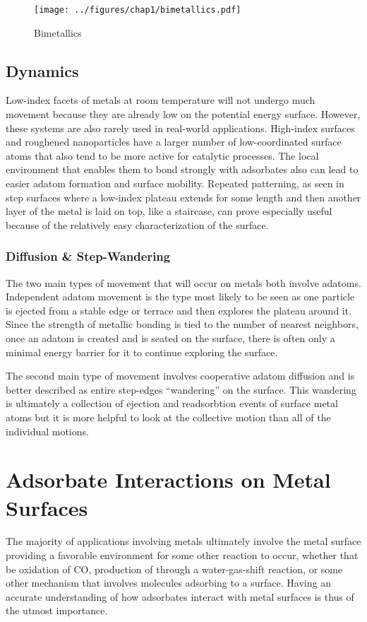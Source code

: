 \begin{figure}
  \texttt{[image: ../figures/chap1/bimetallics.pdf]}
  \caption{Bimetallics}
\label{fig:bimetallics}
\end{figure}

\subsection{Dynamics}
Low-index facets of metals at room temperature will not undergo much movement
because they are already low on the potential energy surface. However, these
systems are also rarely used in real-world applications. High-index surfaces
and roughened nanoparticles have a larger number of low-coordinated surface
atoms that also tend to be more active for catalytic processes. The local
environment that enables them to bond strongly with adsorbates also can lead to
easier adatom formation and surface mobility. Repeated patterning, as seen in
step surfaces where a low-index plateau extends for some length and then
another layer of the metal is laid on top, like a staircase, can prove
especially useful because of the relatively easy characterization of the
surface.

\subsubsection{Diffusion \& Step-Wandering}
The two main types of movement that will occur on metals both involve adatoms.
Independent adatom movement is the type most likely to be seen as one particle
is ejected from a stable edge or terrace and then explores the plateau around
it. Since the strength of metallic bonding is tied to the number of nearest
neighbors, once an adatom is created and is seated on the surface, there is
often only a minimal energy barrier for it to continue exploring the surface. 

The second main type of movement involves cooperative adatom diffusion and is
better described as entire step-edges ``wandering'' on the surface. This
wandering is ultimately a collection of ejection and readsorbtion events of
surface metal atoms but it is more helpful to look at the collective motion
than all of the individual motions.

\section{Adsorbate Interactions on Metal Surfaces}
The majority of applications involving metals ultimately involve the metal
surface providing a favorable environment for some other reaction to occur,
whether that be oxidation of CO, production of  through a
water-gas-shift reaction, or some other mechanism that involves molecules
adsorbing to a surface. Having an accurate understanding of how adsorbates
interact with metal surfaces is thus of the utmost importance. 

